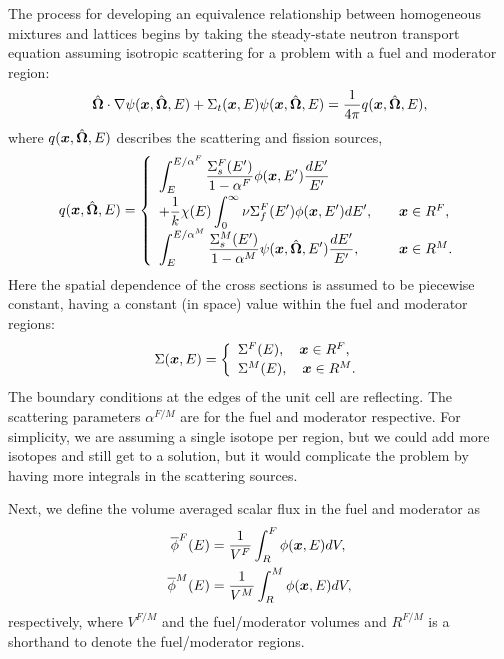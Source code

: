 The process for developing an equivalence relationship between homogeneous mixtures and lattices begins by taking the steady-state neutron transport equation assuming isotropic scattering for a problem with a fuel and moderator region:
\begin{align}
  \hat{\mathbf{\Omega}} \cdot \nabla \psi(\bm{x},\hat{\mathbf{\Omega}},E) + \Sigma_t(\bm{x},E) \psi(\bm{x},\hat{\mathbf{\Omega}},E) = \frac{1}{4\pi} q(\bm{x},\hat{\mathbf{\Omega}},E),
\end{align}
where $q(\bm{x},\hat{\mathbf{\Omega}},E)$ describes the scattering and fission sources,
\begin{align}
  q(\pos,\dir,E) = \left\{ \begin{array}{l l}
  \displaystyle\int_E^{E/\alpha^F} \dfrac{ \Sigma_s^F(E') }{ 1 - \alpha^F } \phi(\pos,E') \dfrac{ dE' }{ E' } & 	\vspace{0.2em} \\
  + \dfrac{1}{k} \chi(E) \displaystyle\int_0^\infty \nu\Sigma_f^F(E') \phi(\pos,E') dE', & \quad \pos \in R^F, \\
  \displaystyle\int_E^{E/\alpha^M} \dfrac{ \Sigma_s^M(E') }{ 1 - \alpha^M } \psi(\pos,\dir,E') \dfrac{ dE' }{ E' } , & \quad \pos \in R^M. \\ \end{array} \right. 
\end{align}
Here the spatial dependence of the cross sections is assumed to be piecewise constant, having a constant (in space) value within the fuel and moderator regions:
\begin{align}
  \Sigma(\pos,E) = \left\{ \begin{array}{l l}
  \Sigma^F(E), \quad \pos \in R^F, \vspace{0.2em} \\
  \Sigma^M(E), \quad \pos \in R^M. \\ \end{array} \right.
\end{align}
The boundary conditions at the edges of the unit cell are reflecting. The scattering parameters $\alpha^{F/M}$ are for the fuel and moderator respective. For simplicity, we are assuming a single isotope per region, but we could add more isotopes and still get to a solution, but it would complicate the problem by having more integrals in the scattering sources. 

Next, we define the volume averaged scalar flux in the fuel and moderator as
\begin{subequations}
\begin{align}
  \overline{\phi}^F(E) &= \frac{1}{V^F} \int_R^F \phi(\bm{x},E) dV , \\
  \overline{\phi}^M(E) &= \frac{1}{V^M} \int_R^M \phi(\bm{x},E) dV ,  
\end{align} 
\end{subequations}
respectively, where $V^{F/M}$ and the fuel/moderator volumes and $R^{F/M}$ is a shorthand to denote the fuel/moderator regions. 

